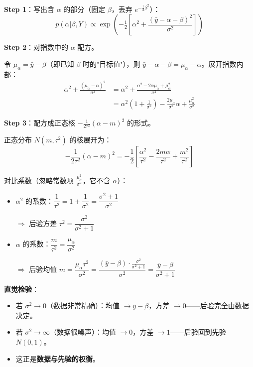 \documentclass[11pt,a4paper]{article}
\begin{document}
\medskip
\textbf{Step 1}：写出含 $\alpha$ 的部分（固定 $\beta$，丢弃 $e^{-\frac{1}{2}\beta^2}$）：
$$p(\alpha | \beta, Y) \propto \exp\!\left(-\tfrac{1}{2}\!\left[\alpha^2 + \frac{(\bar{y} - \alpha - \beta)^2}{\sigma^2}\right]\right)$$

\textbf{Step 2}：对指数中的 $\alpha$ 配方。

令 $\mu_\alpha = \bar{y} - \beta$（即已知 $\beta$ 时的"目标值"），则 $\bar{y} - \alpha - \beta = \mu_\alpha - \alpha$。展开指数内部：
\begin{align*}
\alpha^2 + \frac{(\mu_\alpha - \alpha)^2}{\sigma^2}
&= \alpha^2 + \frac{\alpha^2 - 2\alpha\mu_\alpha + \mu_\alpha^2}{\sigma^2} \\[4pt]
&= \alpha^2\!\left(1 + \frac{1}{\sigma^2}\right) - \frac{2\mu_\alpha}{\sigma^2}\alpha + \frac{\mu_\alpha^2}{\sigma^2}
\end{align*}

\textbf{Step 3}：配方成正态核 $-\frac{1}{2\tau^2}(\alpha - m)^2$ 的形式。

正态分布 $N(m, \tau^2)$ 的核展开为：
$$-\frac{1}{2\tau^2}(\alpha - m)^2 = -\frac{1}{2}\!\left[\frac{\alpha^2}{\tau^2} - \frac{2m\alpha}{\tau^2} + \frac{m^2}{\tau^2}\right]$$

对比系数（忽略常数项 $\frac{\mu_\alpha^2}{\sigma^2}$，它不含 $\alpha$）：
\begin{itemize}
    \item $\alpha^2$ 的系数：$\dfrac{1}{\tau^2} = 1 + \dfrac{1}{\sigma^2} = \dfrac{\sigma^2 + 1}{\sigma^2}$

    $\Rightarrow$ 后验方差 $\tau^2 = \dfrac{\sigma^2}{\sigma^2 + 1}$

    \item $\alpha$ 的系数：$\dfrac{m}{\tau^2} = \dfrac{\mu_\alpha}{\sigma^2}$

    $\Rightarrow$ 后验均值 $m = \dfrac{\mu_\alpha \tau^2}{\sigma^2} = \dfrac{(\bar{y}-\beta) \cdot \frac{\sigma^2}{\sigma^2+1}}{\sigma^2} = \dfrac{\bar{y} - \beta}{\sigma^2 + 1}$
\end{itemize}

\begin{center}
\end{center}

\textbf{直觉检验}：
\begin{itemize}
    \item 若 $\sigma^2 \to 0$（数据非常精确）：均值 $\to \bar{y} - \beta$，方差 $\to 0$——后验完全由数据决定。
    \item 若 $\sigma^2 \to \infty$（数据很噪声）：均值 $\to 0$，方差 $\to 1$——后验回到先验 $N(0,1)$。
    \item 这正是\textbf{数据与先验的权衡}。
\end{itemize}
\end{document}
